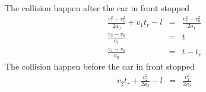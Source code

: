 \documentclass{article}
\begin{document}
\begin{flushleft}
The collision happen after the car in front stopped
\begin{eqnarray}
\frac{v_1^2 - v_0 ^ 2}{2a_0} + v_1 t_r - l & = & \frac{v_2 ^ 2 - v_0 ^ 2}{2a_1}\\
\frac{v_2 - v_0}{a_1} & = & t\\
\frac{v_1 - v_0}{a_0} & = & t - t_r
\end{eqnarray}
The collision happen before the car in front stopped
\begin{eqnarray}
v_2 t_r + \frac{v_2 ^ 2}{2a_2} - l& = &\frac{v_1^2}{2a_1}
\end{eqnarray}
\end{flushleft}
\end{document}
